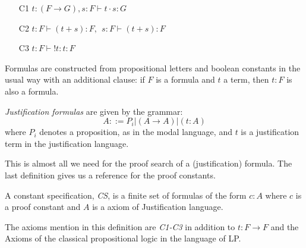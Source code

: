 \begin{rules}\label{rules} 

\begin{itemize} Application, sum and positive introspection respectively.

	\item[C1] $t:(F \rightarrow G), s:F \vdash t \cdot s: G$\label{rule:c1}
	\item[C2] $t:F \vdash (t +s):F, \:\: s:F \vdash (t+s):F$\label{rule:c2}
	\item[C3] $t:F \vdash !t:t:F$\label{rule:c3}
\end{itemize}

\end{rules}

Formulas are constructed from propositional letters and boolean constants in the usual way with an additional clause: if $F$ is a formula and $t$ a term, then $t:F$ is also a formula.

\begin{definition}\label{justification_formulas} \emph{Justification formulas} are given by the grammar:
\[
A ::= P_i|(A \rightarrow A) | (t:A)
\]
where $P_i$ denotes a proposition, as in the modal language, and $t$ is a justification term in the justification language.
\end{definition}

This is almost all we need for the proof search of a (justification) formula. The last definition gives us a reference for the proof constants.

\begin{definition}\label{cs-def} A constant specification, \emph{CS}, is a finite set of formulas of the form $c:A$ where $c$ is a proof constant and $A$ is a axiom of Justification language.
\end{definition}

The axioms mention in this definition are \emph{C1-C3} in addition to $t:F \rightarrow F$ and the Axioms of the classical propositional logic in the language of LP.

